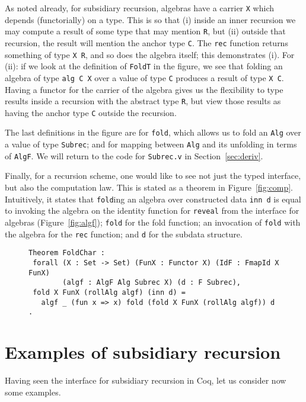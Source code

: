 \documentclass[a4paper,USenglish]{lipics-v2021}
\begin{document}
As noted already, for subsidiary recursion, algebras have a carrier
\verb|X| which depends (functorially) on a type.  This is so that (i)
inside an inner recursion we may compute a result of some type that
may mention \verb|R|, but (ii) outside that recursion, the result will
mention the anchor type \verb|C|.  The \verb|rec| function returns
something of type \verb|X R|, and so does the algebra itself; this
demonstrates (i).  For (ii): if we look at the definition of
\verb|FoldT| in the figure, we see that folding an algebra of type
\verb|alg C X| over a value of type \verb|C| produces a result of type
\verb|X C|.  Having a functor for the carrier of the algebra gives us
the flexibility to type results inside a recursion with the abstract
type \verb|R|, but view those results as having the anchor type
\verb|C| outside the recursion.

The last definitions in the figure are for \verb|fold|, which allows
us to fold an \verb|Alg| over a value of type \verb|Subrec|; and for mapping
between \verb|Alg| and its unfolding in terms of \verb|AlgF|.  We will
return to the code for \verb|Subrec.v| in Section~\ref{sec:deriv}.

Finally, for a recursion scheme, one would like to see not just the
typed interface, but also the computation law.  This is stated as a
theorem in Figure~\ref{fig:comp}.  Intuitively, it states that
\verb|fold|ing an algebra over constructed data \verb|inn d| is equal
to invoking the algebra on the identity function for \verb|reveal|
from the interface for algebras (Figure~\ref{fig:algf}); \verb|fold|
for the fold function; an invocation of \verb|fold| with the algebra
for the \verb|rec| function; and \verb|d| for the subdata structure.

\begin{figure}
\begin{verbatim}
Theorem FoldChar :
 forall (X : Set -> Set) (FunX : Functor X) (IdF : FmapId X FunX)
        (algf : AlgF Alg Subrec X) (d : F Subrec),
 fold X FunX (rollAlg algf) (inn d) =
   algf _ (fun x => x) fold (fold X FunX (rollAlg algf)) d .
\end{verbatim}
\end{figure}

\section{Examples of subsidiary recursion}
\label{sec:examples}

Having seen the interface for subsidiary recursion in Coq, let us
consider now some examples.  
\end{document}
